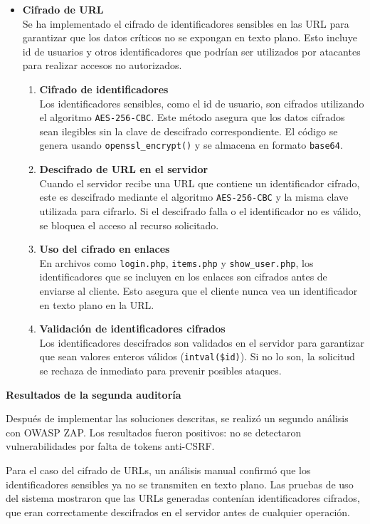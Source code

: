 \documentclass[a4paper,12pt]{article}
\newcommand{\code}[1]{\texttt{#1}}  %
\begin{document}
\begin{itemize}
	\item \textbf{Cifrado de URL\\} Se ha implementado el cifrado de identificadores sensibles en las URL para garantizar que los datos críticos no se expongan en texto plano. Esto incluye id de usuarios y otros identificadores que podrían ser utilizados por atacantes para realizar accesos no autorizados.
	\begin{enumerate}
		\item \textbf{Cifrado de identificadores\\} Los identificadores sensibles, como el id de usuario, son cifrados utilizando el algoritmo \code{AES-256-CBC}\cite{AES}. Este método asegura que los datos cifrados sean ilegibles sin la clave de descifrado correspondiente. El código se genera usando \code{openssl\_encrypt()} y se almacena en formato \code{base64}.
		\item \textbf{Descifrado de URL en el servidor\\} Cuando el servidor recibe una URL que contiene un identificador cifrado, este es descifrado mediante el algoritmo \code{AES-256-CBC} y la misma clave utilizada para cifrarlo. Si el descifrado falla o el identificador no es válido, se bloquea el acceso al recurso solicitado.
		\item \textbf{Uso del cifrado en enlaces\\} En archivos como \code{login.php}, \code{items.php} y \code{show\_user.php}, los identificadores que se incluyen en los enlaces son cifrados antes de enviarse al cliente. Esto asegura que el cliente nunca vea un identificador en texto plano en la URL.
		\item \textbf{Validación de identificadores cifrados\\} Los identificadores descifrados son validados en el servidor para garantizar que sean valores enteros válidos (\code{intval(\$id)}). Si no lo son, la solicitud se rechaza de inmediato para prevenir posibles ataques.
	\end{enumerate}
\end{itemize}

\vspace{1em}


\textbf{Resultados de la segunda auditoría}

Después de implementar las soluciones descritas, se realizó un segundo análisis con OWASP ZAP. Los resultados fueron positivos: no se detectaron vulnerabilidades por falta de tokens anti-CSRF.

Para el caso del cifrado de URLs, un análisis manual confirmó que los identificadores sensibles ya no se transmiten en texto plano. Las pruebas de uso del sistema mostraron que las URLs generadas contenían identificadores cifrados, que eran correctamente descifrados en el servidor antes de cualquier operación.
\end{document}
